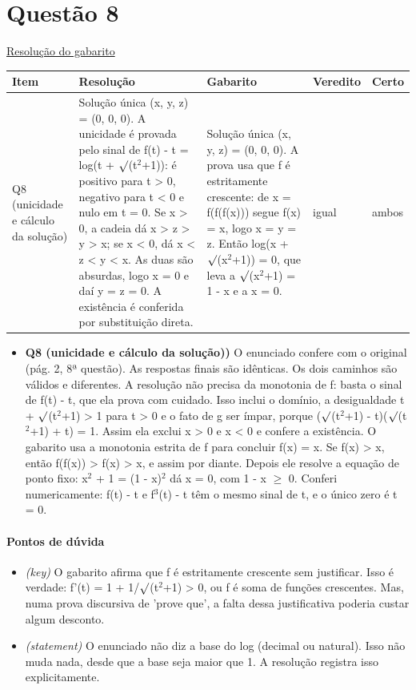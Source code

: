 \documentclass{article}%
\begin{document}
\section*{Questão 8}%
\href{https://poliedroresolve.sistemapoliedro.com.br/vestibulares/ime/2026/ime-2-fase-dia-1-23-10-2025-2-fase-dia-1/dissertativa-8-matematica-2-fase-dia-1-ime-2026}{Resolução do gabarito}\par\smallskip%
\begin{longtable}{@{}p{} p{} p{} p{} p{}@{}}\toprule Item & Resolução & Gabarito & Veredito & Certo \\ \midrule
Q8 (unicidade e cálculo da solução) & Solução única (x, y, z) = (0, 0, 0). A unicidade é provada pelo sinal de f(t) - t = log(t + $\surd$(t$^2$+1)): é positivo para t > 0, negativo para t < 0 e nulo em t = 0. Se x > 0, a cadeia dá x > z > y > x; se x < 0, dá x < z < y < x. As duas são absurdas, logo x = 0 e daí y = z = 0. A existência é conferida por substituição direta. & Solução única (x, y, z) = (0, 0, 0). A prova usa que f é estritamente crescente: de x = f(f(f(x))) segue f(x) = x, logo x = y = z. Então log(x + $\surd$(x$^2$+1)) = 0, que leva a $\surd$(x$^2$+1) = 1 - x e a x = 0. & igual & ambos \\
\bottomrule\end{longtable}%
\begin{itemize}%
\item%
\textbf{Q8 (unicidade e cálculo da solução))} O enunciado confere com o original (pág. 2, 8ª questão). As respostas finais são idênticas. Os dois caminhos são válidos e diferentes. A resolução não precisa da monotonia de f: basta o sinal de f(t) - t, que ela prova com cuidado. Isso inclui o domínio, a desigualdade t + $\surd$(t$^2$+1) > 1 para t > 0 e o fato de g ser ímpar, porque ($\surd$(t$^2$+1) - t)($\surd$(t$^2$+1) + t) = 1. Assim ela exclui x > 0 e x < 0 e confere a existência. O gabarito usa a monotonia estrita de f para concluir f(x) = x. Se f(x) > x, então f(f(x)) > f(x) > x, e assim por diante. Depois ele resolve a equação de ponto fixo: x$^2$ + 1 = (1 - x)$^2$ dá x = 0, com 1 - x $\geq$ 0. Conferi numericamente: f(t) - t e f$^3$(t) - t têm o mesmo sinal de t, e o único zero é t = 0.%
\end{itemize}%
\paragraph{Pontos de dúvida}%
\begin{itemize}%
\item%
\textit{(key)} O gabarito afirma que f é estritamente crescente sem justificar. Isso é verdade: f'(t) = 1 + 1/$\surd$(t$^2$+1) > 0, ou f é soma de funções crescentes. Mas, numa prova discursiva de 'prove que', a falta dessa justificativa poderia custar algum desconto.%
\item%
\textit{(statement)} O enunciado não diz a base do log (decimal ou natural). Isso não muda nada, desde que a base seja maior que 1. A resolução registra isso explicitamente.%
\end{itemize}%
\end{document}
